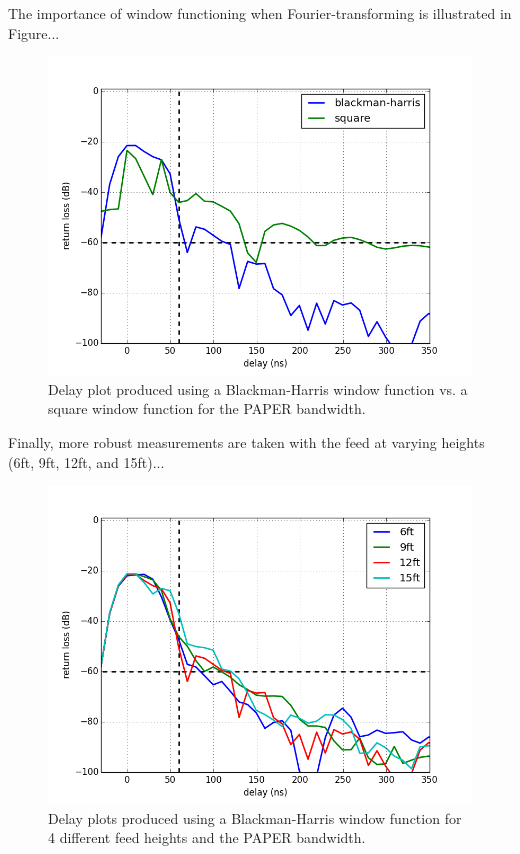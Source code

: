 \documentclass[12pt,preprint]{aastex}
\begin{document}
The importance of window functioning when Fourier-transforming is illustrated in Figure...

\begin{figure}
\centering
\includegraphics[totalheight=0.5\textheight]{plots/bh_vs_sq.png}
\caption{Delay plot produced using a Blackman-Harris window function vs. a square window function for the PAPER bandwidth.}
\label{fig:window}
\end{figure}

Finally, more robust measurements are taken with the feed at varying heights (6ft, 9ft, 12ft, and 15ft)...

\begin{figure}
\centering
\includegraphics[totalheight=0.5\textheight]{plots/delay_heights_paper.png}
\caption{Delay plots produced using a Blackman-Harris window function for 4 different feed heights and the PAPER bandwidth.}
\end{figure}
\end{document}

